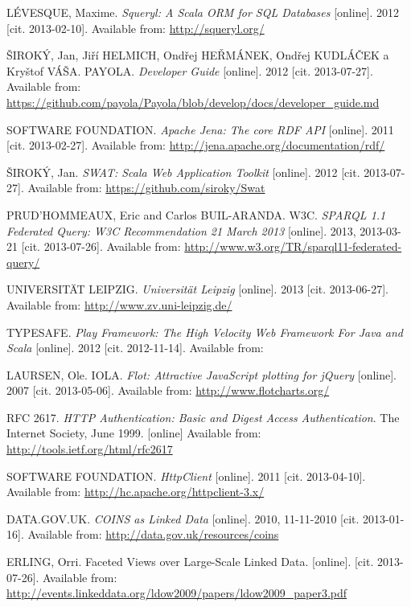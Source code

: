 \begin{thebibliography}{99}
{\sc LÉVESQUE,} Maxime. 
\emph{Squeryl: A Scala ORM for SQL Databases} [online]. 2012 [cit. 2013-02-10].
Available from: \url{http://squeryl.org/}

{\sc ŠIROKÝ,} Jan, Jiří HELMICH, Ondřej HEŘMÁNEK, Ondřej KUDLÁČEK a Kryštof VÁŠA. PAYOLA.
\emph{Developer Guide} [online]. 2012 [cit. 2013-07-27]. 
Available from: \url{https://github.com/payola/Payola/blob/develop/docs/developer_guide.md}

{\scAPACHE SOFTWARE FOUNDATION.} 
\emph{Apache Jena: The core RDF API} [online]. 2011 [cit. 2013-02-27]. 
Available from: \url{http://jena.apache.org/documentation/rdf/}

{\sc ŠIROKÝ,} Jan. 
\emph{SWAT: Scala Web Application Toolkit} [online]. 2012 [cit. 2013-07-27].
Available from: \url{https://github.com/siroky/Swat}

{\sc PRUD'HOMMEAUX,} Eric and Carlos BUIL-ARANDA. W3C.
\emph{SPARQL 1.1 Federated Query: W3C Recommendation 21 March 2013} [online].
2013, 2013-03-21 [cit. 2013-07-26].
Available from: \url{http://www.w3.org/TR/sparql11-federated-query/}

{\sc UNIVERSITÄT LEIPZIG.} \emph{Universität Leipzig} [online]. 2013 [cit. 2013-06-27].
Available from: \url{http://www.zv.uni-leipzig.de/}

{\sc TYPESAFE.}
\emph{Play Framework: The High Velocity Web Framework For Java and Scala} [online].
2012 [cit. 2012-11-14]. 
Available from:  

{\sc LAURSEN,} Ole. IOLA. 
\emph{Flot: Attractive JavaScript plotting for jQuery} [online]. 2007 [cit. 2013-05-06].
Available from: \url{http://www.flotcharts.org/}

RFC 2617.
\emph{HTTP Authentication: Basic and Digest Access Authentication}.
The Internet Society, June 1999. [online]
Available from: \url{http://tools.ietf.org/html/rfc2617}

{\scAPACHE SOFTWARE FOUNDATION.}
\emph{HttpClient} [online]. 2011 [cit. 2013-04-10]. 
Available from: \url{http://hc.apache.org/httpclient-3.x/}

{\sc DATA.GOV.UK.}
\emph{COINS as Linked Data} [online]. 2010, 11-11-2010 [cit. 2013-01-16].
Available from: \url{http://data.gov.uk/resources/coins}

{\sc ERLING,} Orri.
Faceted Views over Large-Scale Linked Data.  [online]. [cit. 2013-07-26].
Available from: 
\url{http://events.linkeddata.org/ldow2009/papers/ldow2009_paper3.pdf}


\end{thebibliography}
